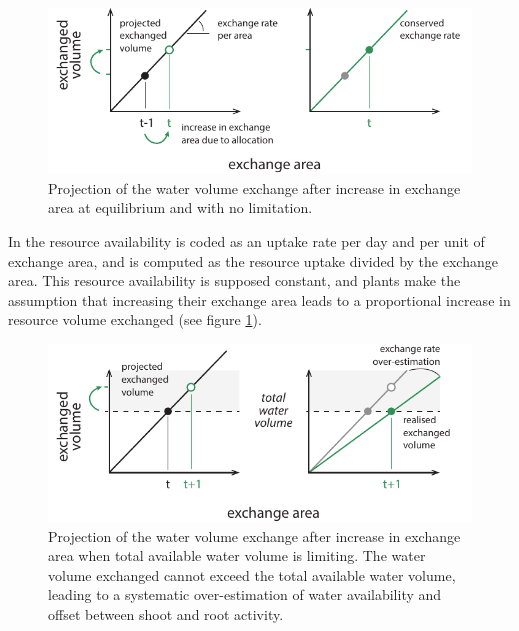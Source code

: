 \begin{figure}\label{fig:exchange_volume_projection}
\includegraphics[width = \textwidth]{./2_PP/Figures/Concepts/exchange_volume_projection.pdf}
\caption{Projection of the water volume exchange after increase in exchange area at equilibrium and with no limitation.}
\end{figure}

In \model the resource availability is coded as an uptake rate per day and per unit of exchange area, and is computed as the resource uptake divided by the exchange area. This resource availability is supposed constant, and plants make the assumption that increasing their exchange area leads to a proportional increase in resource volume exchanged (see figure \ref{fig:exchange_volume_projection}).

\begin{figure}\label{fig:exhaustion}
\includegraphics[width = \textwidth]{./2_PP/Figures/Concepts/exhaustion2.pdf}
\caption{Projection of the water volume exchange after increase in exchange area when total available water volume is limiting. The water volume exchanged cannot exceed the total available water volume, leading to a systematic over-estimation of water availability and offset between shoot and root activity.}
\end{figure}


